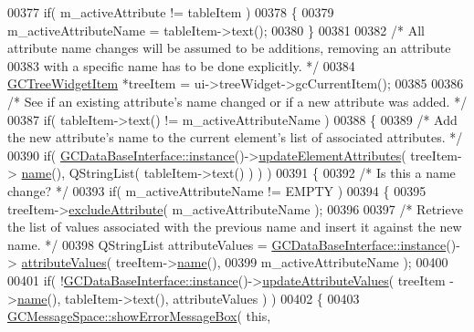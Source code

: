 \begin{DoxyCode}
{00377     \textcolor{keywordflow}{if}( m\_activeAttribute != tableItem )
00378     \{
00379       m\_activeAttributeName = tableItem->text();
00380     \}
00381 
00382     \textcolor{comment}{/* All attribute name changes will be assumed to be additions, removing an
       attribute}
00383 \textcolor{comment}{      with a specific name has to be done explicitly. */}
00384     \hyperlink{class_g_c_tree_widget_item}{GCTreeWidgetItem} *treeItem = ui->treeWidget->gcCurrentItem();
00385 
00386     \textcolor{comment}{/* See if an existing attribute's name changed or if a new attribute was
       added. */}
00387     \textcolor{keywordflow}{if}( tableItem->text() != m\_activeAttributeName )
00388     \{
00389       \textcolor{comment}{/* Add the new attribute's name to the current element's list of
       associated attributes. */}
00390       \textcolor{keywordflow}{if}( \hyperlink{class_g_c_data_base_interface_a1baea9c0667aa8b610ec30076fcab84c}{GCDataBaseInterface::instance}()->\hyperlink{class_g_c_data_base_interface_abc13d0cb75b233fd83575bfef575ff19}{updateElementAttributes}( treeItem->
      \hyperlink{class_g_c_tree_widget_item_a3af8c66a690cd55986a38b996a375ba4}{name}(), QStringList( tableItem->text() ) ) )
00391       \{
00392         \textcolor{comment}{/* Is this a name change? */}
00393         \textcolor{keywordflow}{if}( m\_activeAttributeName != EMPTY )
00394         \{
00395           treeItem->\hyperlink{class_g_c_tree_widget_item_a76e60292eec635fd2e6df27a3e162e16}{excludeAttribute}( m\_activeAttributeName );
00396 
00397           \textcolor{comment}{/* Retrieve the list of values associated with the previous name and
       insert it against the new name. */}
00398           QStringList attributeValues = \hyperlink{class_g_c_data_base_interface_a1baea9c0667aa8b610ec30076fcab84c}{GCDataBaseInterface::instance}()->
      \hyperlink{class_g_c_data_base_interface_a329e17f6c02c62fd554884f2b5a7e2df}{attributeValues}( treeItem->\hyperlink{class_g_c_tree_widget_item_a3af8c66a690cd55986a38b996a375ba4}{name}(),
00399                                                                                
                 m\_activeAttributeName );
00400 
00401           \textcolor{keywordflow}{if}( !\hyperlink{class_g_c_data_base_interface_a1baea9c0667aa8b610ec30076fcab84c}{GCDataBaseInterface::instance}()->\hyperlink{class_g_c_data_base_interface_ae4f158875b5a8a109d301f19ce5d21ae}{updateAttributeValues}( treeItem
      ->\hyperlink{class_g_c_tree_widget_item_a3af8c66a690cd55986a38b996a375ba4}{name}(), tableItem->text(), attributeValues ) )
00402           \{
00403             \hyperlink{namespace_g_c_message_space_ab118b3a133686167617eb955029fd44e}{GCMessageSpace::showErrorMessageBox}( \textcolor{keyword}{this}, 
}
\end{DoxyCode}
